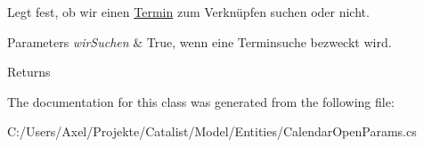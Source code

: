 Legt fest, ob wir einen \hyperlink{class_products_1_1_model_1_1_entities_1_1_termin}{Termin} zum Verknüpfen suchen oder nicht. 


\begin{DoxyParams}{Parameters}
{\em wir\+Suchen} & True, wenn eine Terminsuche bezweckt wird.\\
\hline
\end{DoxyParams}
\begin{DoxyReturn}{Returns}

\end{DoxyReturn}


The documentation for this class was generated from the following file\+:\begin{DoxyCompactItemize}
\item 
C\+:/\+Users/\+Axel/\+Projekte/\+Catalist/\+Model/\+Entities/Calendar\+Open\+Params.\+cs\end{DoxyCompactItemize}
